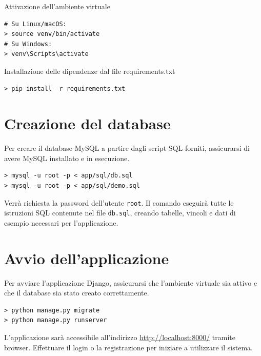 \documentclass[a4paper,12pt]{report}
\begin{document}
\noindent Attivazione dell'ambiente virtuale
\begin{verbatim}
# Su Linux/macOS:
> source venv/bin/activate
# Su Windows:
> venv\Scripts\activate
\end{verbatim}

\noindent Installazione delle dipendenze dal file requirements.txt
\begin{verbatim}
> pip install -r requirements.txt
\end{verbatim}

\section{Creazione del database}

Per creare il database MySQL a partire dagli script SQL forniti, assicurarsi di avere MySQL
installato e in esecuzione.

\begin{verbatim}
> mysql -u root -p < app/sql/db.sql
> mysql -u root -p < app/sql/demo.sql
\end{verbatim}

Verrà richiesta la password dell'utente \texttt{root}. Il comando eseguirà tutte le
istruzioni SQL contenute nel file \texttt{db.sql}, creando tabelle, vincoli e dati di
esempio necessari per l'applicazione.

\section{Avvio dell'applicazione}

Per avviare l'applicazione Django, assicurarsi che l'ambiente virtuale sia attivo e che il database
sia stato creato correttamente.

\begin{verbatim}
> python manage.py migrate
> python manage.py runserver
\end{verbatim}

L'applicazione sarà accessibile all'indirizzo \url{http://localhost:8000/} tramite browser. Effettuare
il login o la registrazione per iniziare a utilizzare il sistema.
\end{document}

